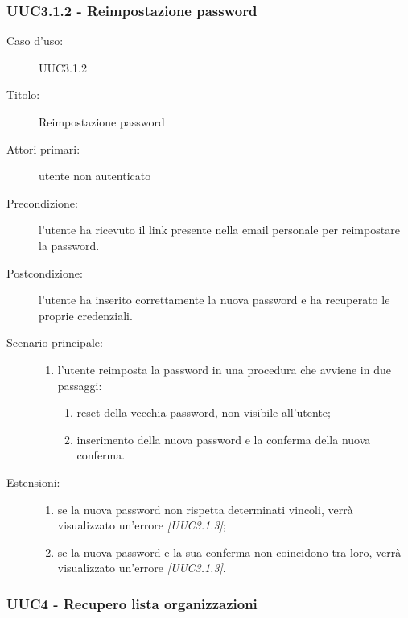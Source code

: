 \documentclass[casi-duso]{subfiles}
\begin{document}
\subsubsection{UUC3.1.2 - Reimpostazione password}%
\label{subsub:UUC3.1.2utente}
\begin{description}
  \item[Caso d’uso:] UUC3.1.2
  \item[Titolo:] Reimpostazione password
  \item[Attori primari:] utente non autenticato
  \item[Precondizione:] l'utente ha ricevuto il link presente nella email personale per reimpostare la password.
  \item[Postcondizione:] l'utente ha inserito correttamente la nuova password e ha recuperato le proprie credenziali.
  \item[Scenario principale:]
        \begin{enumerate}
          \item l'utente reimposta la password in una procedura che avviene in due passaggi:
                \begin{enumerate}
                  \item reset della vecchia password, non visibile all'utente;
                  \item inserimento della nuova password e la conferma della nuova conferma.
                \end{enumerate}
        \end{enumerate}
  \item[Estensioni:]
        \begin{enumerate}
          \item se la nuova password non rispetta determinati vincoli, verrà visualizzato un'errore \emph{[UUC3.1.3]};
          \item se la nuova password e la sua conferma non coincidono tra loro, verrà visualizzato un'errore \emph{[UUC3.1.3]}.
        \end{enumerate}
\end{description}

\subsubsection{UUC4 - Recupero lista organizzazioni}%
\label{subsub:UUC4utente}
\end{document}
